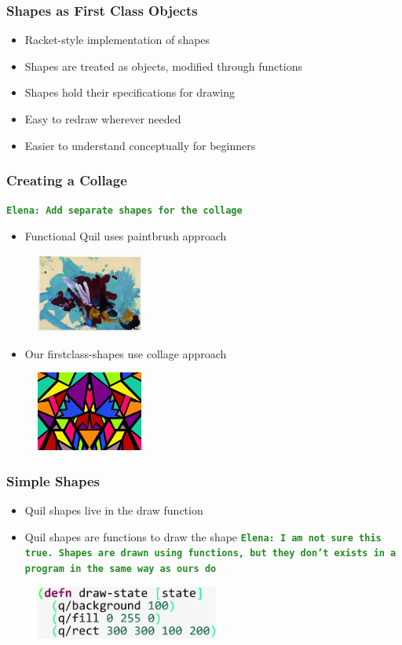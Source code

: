 \documentclass{beamer}
\newcommand{\comment}[1]{{\bf \tt  {#1}}}
\newcommand{\emcomment}[1]{\textcolor{ForestGreen}{\comment{Elena: {#1}}}}
\begin{document}
\begin{frame}
\frametitle{Shapes as First Class Objects}
	\begin{itemize}
		\item Racket-style implementation of shapes
		\item Shapes are treated as objects, modified through functions
		\item Shapes hold their specifications for drawing
		\item Easy to redraw wherever needed
		\item Easier to understand conceptually for beginners
	\end{itemize}
\end{frame}

\begin{frame}
\frametitle{Creating a Collage}
\emcomment{Add separate shapes for the collage}
	\begin{itemize}
		\item Functional Quil uses paintbrush approach
	\end{itemize}
	\begin{figure}
	\includegraphics[width=3.5cm]{PresentationImages/painting.jpg}
	\end{figure}
	\begin{itemize}
		\item Our firstclass-shapes use collage approach
	\end{itemize}
	\begin{figure}
	\includegraphics[width=3.5cm]{PresentationImages/collage.jpg}
	\end{figure}
\end{frame}

\begin{frame}
\frametitle{Simple Shapes}
	\begin{itemize}
		\item Quil shapes live in the draw function 
		\item Quil shapes are functions to draw the shape \emcomment{I am not sure this true. Shapes are drawn using functions, but they don't exists in a program in the same way as ours do}
	\end{itemize}
	\begin{figure}
		\includegraphics[width=6cm]{PresentationImages/quilGreenRect.png}
	\end{figure}
\end{frame}
\end{document}
